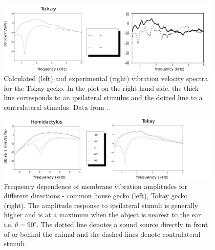 \begin{figure}[ht!]
 \centering
 \includegraphics[width=1.0\linewidth]{Diagrams/Plots/tokayipsivscontrafull.png}
 \caption[Frequency dependence of ipsi- and contralateral membrane vibration amplitudes - Tokay gecko]{Calculated (left) and experimental (right) vibration velocity spectra for the Tokay gecko. In
 the plot on the right hand side, the thick line corresponds to an ipsilateral stimulus and the dotted line to a contralateral stimulus.  Data from \cite{dalsgaardmanley1}.}
  \label{tokayipsivscontrafull}
\end{figure}
\begin{figure}[ht!]
 \centering
  \includegraphics[width=1.15\linewidth]{Diagrams/Plots/freqdepboth.png}
  \caption[Frequency dependence of membrane vibration amplitudes for different directions.]{Frequency dependence of membrane vibration amplitudes for different directions - common house gecko (left), Tokay gecko (right). 
  The amplitude response to ipsilateral stimuli is generally higher and is at a maximum when the object is nearest to the ear i.e. $\theta=90^\circ$. The dotted line denotes a sound source directly in front of or behind the animal and the dashed lines denote contralateral stimuli.}
  \label{freqdepboth}
\end{figure}

